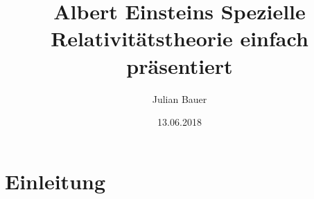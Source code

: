 \documentclass[]{beamer}%
\begin{document}
\title{Albert Einsteins \glqq{}Spezielle Relativitätstheorie\grqq{} einfach präsentiert}
\author[Julian Bauer]{\begin{tabular}{c} 
Julian Bauer 
\end{tabular}}

\date[]{13.06.2018}


\begin{frame}
\titlepage
\end{frame}

\begin{frame}
\tableofcontents
\end{frame}


\section{Einleitung}
\end{document}
